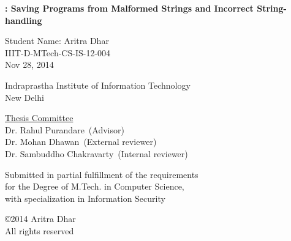 

\def\addrone{IIIT-Delhi, Okhla Phase 3}
\def\addrtwo{New Delhi, India}

\begin{center}
\end{center}


\def\degree{M.Tech. in Computer Science with Specialization in Information Security}


\def\submissiondate{December 08, 2014}

\def\supervisorone{Dr. Rahul Purandare}
\def\external{Dr. Mohan Dhawan}
\def\internal{Dr. Sambuddho Chakravarty}

%
%
%
%
%
%

\thispagestyle{empty}

\begin{center}

{\LARGE \bf {\tool: Saving Programs from Malformed Strings and Incorrect
String-handling}

 }  
 \vspace{.3in}
 
 {\Large{Student Name: Aritra Dhar}} \\  
 \vspace{.1in} 
 IIIT-D-MTech-CS-IS-12-004 \\

 Nov 28, 2014 \\
  
    \vspace{.35in}

  \vspace{.25in}

{Indraprastha Institute of Information Technology\\
New Delhi}

\vspace{.35in}  {\underline{Thesis Committee}} \\ 
\supervisorone~(Advisor) \\
\external~(External reviewer) \\
\internal~(Internal reviewer)
  \\ \vspace{.35in}


 {Submitted in partial fulfillment of the requirements \\for the Degree of M.Tech. in Computer Science, \\ with specialization in Information Security}

\vspace{1.2in}


\copyright 2014 Aritra Dhar \\ All rights reserved \\
\vspace{.8in}


\end{center}


